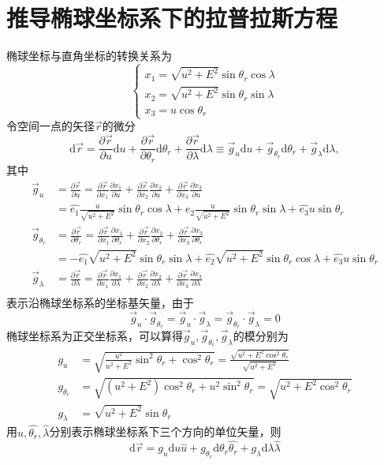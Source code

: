 \documentclass{article}
\begin{document}
\section{推导椭球坐标系下的拉普拉斯方程}
椭球坐标与直角坐标的转换关系为
\[
\begin{cases}
x_1 = \sqrt{u^2 + E^2} \sin \theta_r \cos \lambda\\
x_2 = \sqrt{u^2 + E^2} \sin \theta_r \sin \lambda\\
x_3 = u \cos \theta_r
\end{cases}
\]
令空间一点的矢径$\vec{r}$的微分
$$
\mathrm{d}\vec{r} = \frac{\partial \vec{r}}{\partial u}\mathrm{d}u +\frac{\partial \vec{r}}{\partial \theta_r}\mathrm{d}\theta_r +\frac{\partial \vec{r}}{\partial \lambda}\mathrm{d}\lambda \equiv \vec{g}_u \mathrm{d}u + \vec{g}_{\theta_r}\mathrm{d}\theta_r + \vec{g}_{\lambda}\mathrm{d}\lambda,
$$
其中
\begin{align*}
    \vec{g}_u & = \frac{\partial \vec{r}}{\partial u} = \frac{\partial \vec{r}}{\partial x_1}\frac{\partial x_1}{\partial u} + \frac{\partial \vec{r}}{\partial x_2}\frac{\partial x_2}{\partial u} + \frac{\partial \vec{r}}{\partial x_3}\frac{\partial x_3}{\partial u}\\
    & = \hat{e_1} \frac{u}{\sqrt{u^2 + E^2}}\sin\theta_r\cos\lambda + \hat{e_2} \frac{u}{\sqrt{u^2 + E^2}}\sin\theta_r\sin\lambda + \hat{e_3} u \sin\theta_r\\
    \vec{g}_{\theta_r} & = \frac{\partial \vec{r}}{\partial \theta_r} = \frac{\partial \vec{r}}{\partial x_1}\frac{\partial x_1}{\partial \theta_r} + \frac{\partial \vec{r}}{\partial x_2}\frac{\partial x_2}{\partial \theta_r} + \frac{\partial \vec{r}}{\partial x_3}\frac{\partial x_3}{\partial \theta_r}\\
    & = - \hat{e_1} \sqrt{u^2 + E^2} \sin\theta_r\sin\lambda + \hat{e_2} \sqrt{u^2 + E^2}\sin\theta_r\cos\lambda + \hat{e_3} u \sin\theta_r\\
    \vec{g}_{\lambda} & = \frac{\partial \vec{r}}{\partial \lambda} = \frac{\partial \vec{r}}{\partial x_1}\frac{\partial x_1}{\partial \lambda} + \frac{\partial \vec{r}}{\partial x_2}\frac{\partial x_2}{\partial \lambda} + \frac{\partial \vec{r}}{\partial x_3}\frac{\partial x_3}{\partial \lambda}\\
\end{align*}
表示沿椭球坐标系的坐标基矢量，由于
    $$
    \vec{g}_u \cdot \vec{g}_{\theta_r} = \vec{g}_u \cdot \vec{g}_{\lambda} = \vec{g}_{\theta_r} \cdot \vec{g}_{\lambda} = 0
    $$
椭球坐标系为正交坐标系，可以算得$\vec{g}_u, \vec{g}_{\theta_r}, \vec{g}_\lambda$的模分别为
\begin{align*}
    g_u & = \sqrt{\frac{u^2}{u^2+E^2}\sin^2\theta_r + \cos^2 \theta_r} = \frac{\sqrt{u^2 + E^2\cos^2\theta_r}}{\sqrt{u^2+E^2}}\\
    g_{\theta_r} & = \sqrt{(u^2+E^2)\cos^2\theta_r + u^2\sin^2\theta_r} = \sqrt{u^2 + E^2\cos^2\theta_r}\\
    g_\lambda & = \sqrt{u^2+E^2}\sin\theta_r
\end{align*}
用$\hat{u},\hat{\theta_r},\hat{\lambda}$分别表示椭球坐标系下三个方向的单位矢量，则
\[
\mathrm{d}\vec{r} = g_u\mathrm{d}u\hat{u} + g_{\theta_r}\mathrm{d}\theta_r\hat{\theta_r} + g_\lambda \mathrm{d}\lambda \hat{\lambda}
\]
\end{document}
